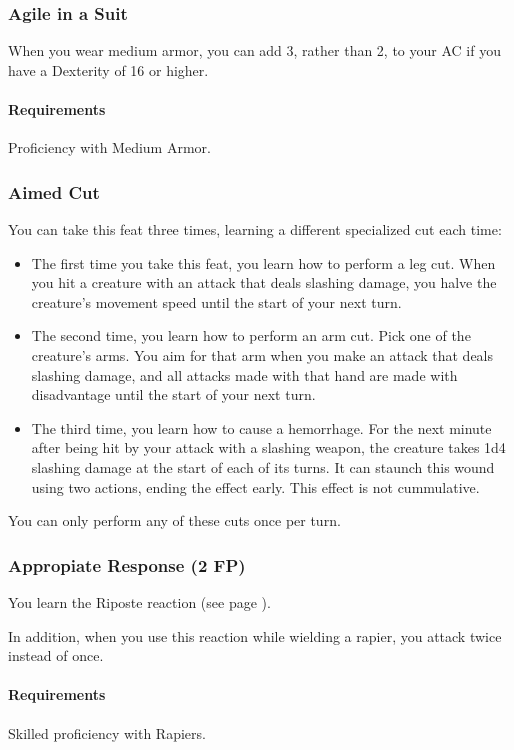 \subsubsection{Agile in a Suit} \label{feat::agileinasuit}
    When you wear medium armor, you can add 3, rather than 2, to your AC if you have a Dexterity of 16 or higher.
    \paragraph{Requirements} Proficiency with Medium Armor.
\subsubsection{Aimed Cut} \label{feat::aimedcut}
    You can take this feat three times, learning a different specialized cut each time:
    \begin{itemize}
        \item The first time you take this feat, you learn how to perform a leg cut.
        When you hit a creature with an attack that deals slashing damage, you halve the creature's movement speed until the start of your next turn.
        \item The second time, you learn how to perform an arm cut.
        Pick one of the creature's arms.
        You aim for that arm when you make an attack that deals slashing damage, and all attacks made with that hand are made with disadvantage until the start of your next turn.
        \item The third time, you learn how to cause a hemorrhage.
        For the next minute after being hit by your attack with a slashing weapon, the creature takes 1d4 slashing damage at the start of each of its turns.
        It can staunch this wound using two actions, ending the effect early.
        This effect is not cummulative.
    \end{itemize}

    You can only perform any of these cuts once per turn.
\subsubsection{Appropiate Response (2 FP)} \label{feat::appropiateresponse}
    You learn the Riposte reaction (see page \pageref{act::riposte}).

    In addition, when you use this reaction while wielding a rapier, you attack twice instead of once.
    \paragraph{Requirements} Skilled proficiency with Rapiers.
